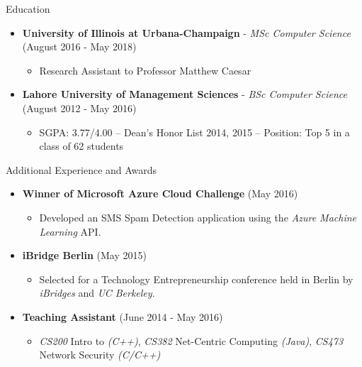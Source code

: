 \documentclass[]{Gohar_CV_Jobs}
\begin{document}
    \begin{cvsection}{Education}
        \begin{cvsubsection}{}{}{}
            \begin{itemize}
                \item \textbf{University of Illinois at Urbana-Champaign} - \textit{MSc Computer Science} (August 2016 - May 2018)
                    \begin{itemize}
                        \item Research Assistant to Professor Matthew Caesar 
                    \end{itemize}
                \item \textbf{Lahore University of Management Sciences} - \textit{BSc Computer Science} (August 2012 - May 2016)
                    \begin{itemize}
                        \item SGPA: 3.77/4.00 – Dean’s Honor List 2014, 2015 – Position: Top 5 in a class of 62 students
                    \end{itemize}
            \end{itemize}
        \end{cvsubsection}
    \end{cvsection}
    
    \begin{cvsection}{Additional Experience and Awards}
        \begin{cvsubsection}{}{}{}  
            \begin{itemize}
                \item \textbf{Winner of Microsoft Azure Cloud Challenge} (May 2016)
                    \begin{itemize}
                        \item Developed an SMS Spam Detection application using the \textit{Azure Machine Learning} API.
                    \end{itemize}
                \item \textbf{iBridge Berlin} (May 2015) 
                    \begin{itemize}
                        \item Selected for a Technology Entrepreneurship conference held in Berlin by \textit{iBridges} and \textit{UC Berkeley}.
                    \end{itemize}
                \item \textbf{Teaching Assistant} (June 2014 - May 2016) 
                    \begin{itemize}
                        \item \textit{CS200} Intro to \textit{(C++)}, \textit{CS382} Net-Centric Computing \textit{(Java)}, \textit{CS473} Network Security \textit{(C/C++)}
                    \end{itemize}
            \end{itemize}
        \end{cvsubsection}
    \end{cvsection}
\end{document}
